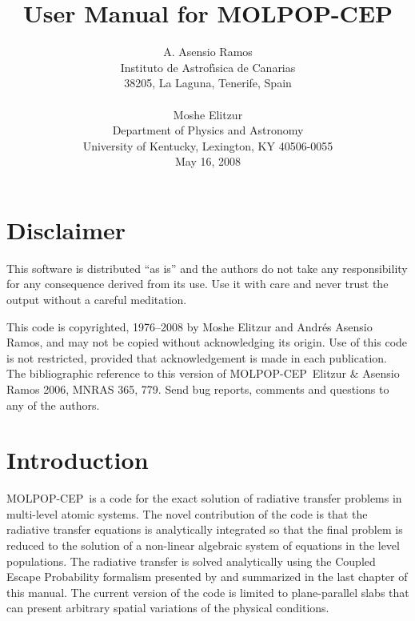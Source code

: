 \documentclass[12pt]{article}
\def\M{MOLPOP-CEP}
\begin{document}
\title                  {\sc User Manual for \M}

\author{ A. Asensio Ramos \\
         Instituto de Astrof\'{\i}sica de Canarias\\
         38205, La Laguna, Tenerife, Spain\\ \\
        Moshe Elitzur \\
        Department of Physics and Astronomy \\
        University of Kentucky, Lexington, KY 40506-0055
        \\[0.5in] May 16, 2008}%
\date{}
\maketitle


\tableofcontents

\newpage

\section*{Disclaimer}

This software is distributed ``as is'' and the authors do not take any
responsibility for any consequence derived from its use. Use it with care and
never trust the output without a careful meditation. 

This code is copyrighted,
1976--2008 by Moshe Elitzur and Andr\'es Asensio Ramos, and may not be copied
without acknowledging its origin. Use of this code is not restricted, provided
that acknowledgement is made in each publication. The bibliographic reference
to this version of \M\ Elitzur \& Asensio Ramos 2006, MNRAS 365, 779. Send bug
reports, comments and questions to any of the authors.


\newpage

\section{Introduction}

\M\ is a code for the exact solution of radiative transfer problems in
multi-level atomic systems. The novel contribution of the code is that the
radiative transfer equations is analytically integrated so that the final
problem is reduced to the solution of a non-linear algebraic system of
equations in the level populations. The radiative transfer is solved
analytically using the Coupled Escape Probability formalism presented by
\cite{elitzur_asensio_cep06} and summarized in the last chapter of this manual.
The current version of the code is limited to plane-parallel slabs that can
present arbitrary spatial variations of the physical conditions.
\end{document}
